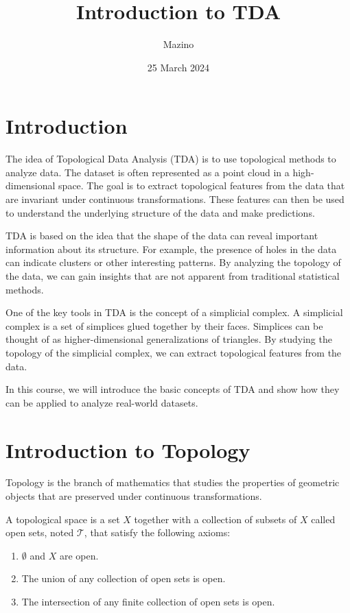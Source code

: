 \documentclass{article}
\title{Introduction to TDA}
\author{Mazino}
\date{25 March 2024}
\begin{document}
\maketitle

\section{Introduction}

The idea of Topological Data Analysis (TDA) is to use topological methods to analyze data.
The dataset is often represented as a point cloud in a high-dimensional space.
The goal is to extract topological features from the data that are invariant under continuous transformations.
These features can then be used to understand the underlying structure of the data and make predictions.

TDA is based on the idea that the shape of the data can reveal important information about its structure.
For example, the presence of holes in the data can indicate clusters or other interesting patterns.
By analyzing the topology of the data, we can gain insights that are not apparent from traditional statistical methods.

One of the key tools in TDA is the concept of a simplicial complex.
A simplicial complex is a set of simplices glued together by their faces.
Simplices can be thought of as higher-dimensional generalizations of triangles.
By studying the topology of the simplicial complex, we can extract topological features from the data.

In this course, we will introduce the basic concepts of TDA and show how they can be applied to analyze real-world datasets.

\section{Introduction to Topology}

Topology is the branch of mathematics that studies the properties of geometric objects that are preserved under continuous transformations.

\begin{definition}
    A topological space is a set $X$ together with a collection of subsets of $X$ called open sets, noted $\mathcal{T}$, that satisfy the following axioms:
    \begin{enumerate}
        \item \(\emptyset \) and \(X \) are open.
        \item The union of any collection of open sets is open.
        \item The intersection of any finite collection of open sets is open.
    \end{enumerate}
\end{definition}
\end{document}
